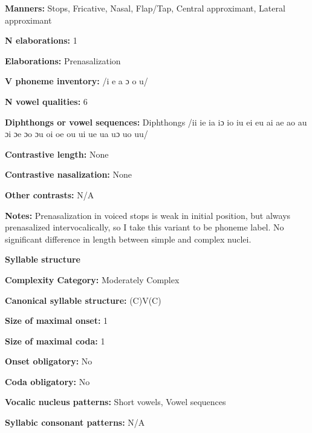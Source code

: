 \textbf{Manners:} Stops, Fricative, Nasal, Flap/Tap, Central approximant, Lateral approximant



\textbf{N elaborations:} 1



\textbf{Elaborations:} Prenasalization



\textbf{V phoneme inventory:} /i e a ɔ o u/



\textbf{N vowel qualities:} 6



\textbf{Diphthongs or vowel sequences:} Diphthongs /ii ie ia iɔ io iu ei eu ai ae ao au ɔi ɔe ɔo ɔu oi oe ou ui ue ua uɔ uo uu/



\textbf{Contrastive length:} None



\textbf{Contrastive nasalization:} None



\textbf{Other contrasts:} N/A



\textbf{Notes:} Prenasalization in voiced stops is weak in initial position, but always prenasalized intervocalically, so I take this variant to be phoneme label. No significant difference in length between simple and complex nuclei.



\textbf{Syllable structure}



\textbf{Complexity Category:} Moderately Complex



\textbf{Canonical syllable structure:} (C)V(C) \citep[14-18]{McElhanon1970}



\textbf{Size of maximal onset:} 1



\textbf{Size of maximal coda:} 1



\textbf{Onset obligatory:} No



\textbf{Coda obligatory:} No



\textbf{Vocalic nucleus patterns:} Short vowels, Vowel sequences



\textbf{Syllabic consonant patterns:} N/A




